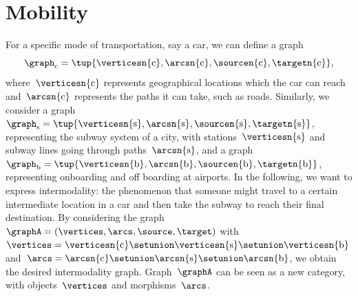 
\section{Mobility}

For a specific mode of transportation, say a car, we can define a graph
\begin{equation}
    \graph_\mathrm{c}=\tup{
        \verticesn{\mathrm{c}},
        \arcsn{\mathrm{c}},
        \sourcen{\mathrm{c}},
        \targetn{\mathrm{c}}
    },
\end{equation}
where~$\verticesn{\mathrm{c}}$ represents geographical locations which the car can reach and~$\arcsn{\mathrm{c}}$ represents the paths it can take, such as roads.
Similarly, we consider a graph~$\graph_\mathrm{s}=\tup{\verticesn{\mathrm{s}},\arcsn{\mathrm{s}},\sourcen{\mathrm{s}},\targetn{\mathrm{s}}}$, representing the subway system of a city, with stations~$\verticesn{\mathrm{s}}$ and subway lines going through paths~$\arcsn{\mathrm{s}}$, and a graph~$\graph_\mathrm{b}=\tup{\verticesn{\mathrm{b}},\arcsn{\mathrm{b}},\sourcen{\mathrm{b}},\targetn{\mathrm{b}}}$, representing onboarding and off boarding at airports.
In the following, we want to express intermodality: the phenomenon that someone might travel to a certain intermediate location in a car and then take the subway to reach their final destination.
By considering the graph~$\graphA=(\vertices,\arcs,\source,\target)$ with~$\vertices=\verticesn{\mathrm{c}}\setunion \verticesn{\mathrm{s}}\setunion \verticesn{\mathrm{b}}$ and~$\arcs=\arcsn{\mathrm{c}}\setunion \arcsn{\mathrm{s}}\setunion \arcsn{\mathrm{b}}$, we obtain the desired intermodality graph.
Graph~$\graphA$ can be seen as a new category, with objects~$\vertices$ and morphisms~$\arcs$.
